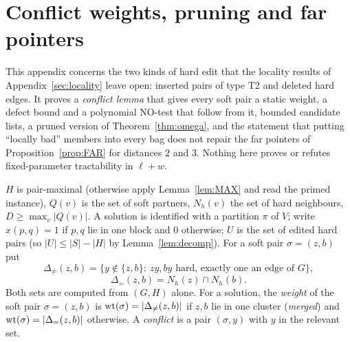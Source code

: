 \section{Conflict weights, pruning and far pointers}\label{app:conflicts}\label{sec:pointers}
This appendix concerns the two kinds of hard edit that the locality results of Appendix~\ref{sec:locality} leave open: inserted pairs of type T2 and deleted hard edges. It proves a \emph{conflict lemma} that gives every soft pair a static weight, a defect bound and a polynomial NO-test that follow from it, bounded candidate lists, a pruned version of Theorem~\ref{thm:omega}, and the statement that putting ``locally bad'' members into every bag does not repair the far pointers of Proposition~\ref{prop:FAR} for distances $2$ and $3$. Nothing here proves or refutes fixed-parameter tractability in $\ell+w$.

$H$ is pair-maximal (otherwise apply Lemma~\ref{lem:MAX} and read the primed instance), $Q(v)$ is the set of soft partners, $N_h(v)$ the set of hard neighbours, $D\ge\max_v|Q(v)|$. A solution is identified with a partition $\pi$ of $V$; write $x(p,q)=1$ if $p,q$ lie in one block and $0$ otherwise; $U$ is the set of edited hard pairs (so $|U|\le|S|-|H|$ by Lemma~\ref{lem:decomp}). For a soft pair $\sigma=(z,b)$ put
\[
\Delta_{\neq}(z,b)=\{y\notin\{z,b\}:\ zy,by\text{ hard, exactly one an edge of }G\},
\]
\[
\Delta_{=}(z,b)=N_h(z)\cap N_h(b).
\]
Both sets are computed from $(G,H)$ alone. For a solution, the \emph{weight} of the soft pair $\sigma=(z,b)$ is $\mathrm{wt}(\sigma)=|\Delta_{\neq}(z,b)|$ if $z,b$ lie in one cluster (\emph{merged}) and $\mathrm{wt}(\sigma)=|\Delta_{=}(z,b)|$ otherwise. A \emph{conflict} is a pair $(\sigma,y)$ with $y$ in the relevant set.

